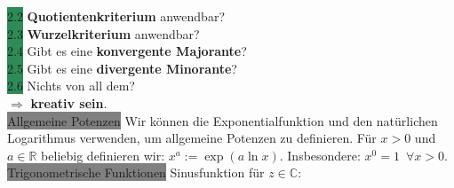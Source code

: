 \documentclass[landscape, 10pt]{article}
\newcommand{\R}{\mathbb{R}}
\newcommand{\C}{\mathbb{C}}
\begin{document}
\begin{multicols}{3}
              \colorbox{SeaGreen}{2.2} \textbf{Quotientenkriterium} anwendbar?\\
              \colorbox{SeaGreen}{2.3} \textbf{Wurzelkriterium} anwendbar?\\
              \colorbox{SeaGreen}{2.4} Gibt es eine 
                     \textbf{konvergente Majorante}?\\
              \colorbox{SeaGreen}{2.5} Gibt es eine 
                     \textbf{divergente Minorante}?\\
              \colorbox{SeaGreen}{2.6} Nichts von all dem?\\
              $\Longrightarrow$ \textbf{kreativ sein}.\\
       \colorbox{gray}{Allgemeine Potenzen} Wir können die Exponentialfunktion
              und den natürlichen Logarithmus verwenden, um 
              allgemeine Potenzen zu definieren. Für $x>0$ und
              $a\in\R$ beliebig definieren wir:
              $x^a:=\exp(a\ln x)$. 
              Insbesondere: $x^0=1\enspace\forall x>0$.\\
       \colorbox{gray}{Trigonometrische Funktionen} Sinusfunktion für $z\in\C:$

\end{multicols}
\end{document}
